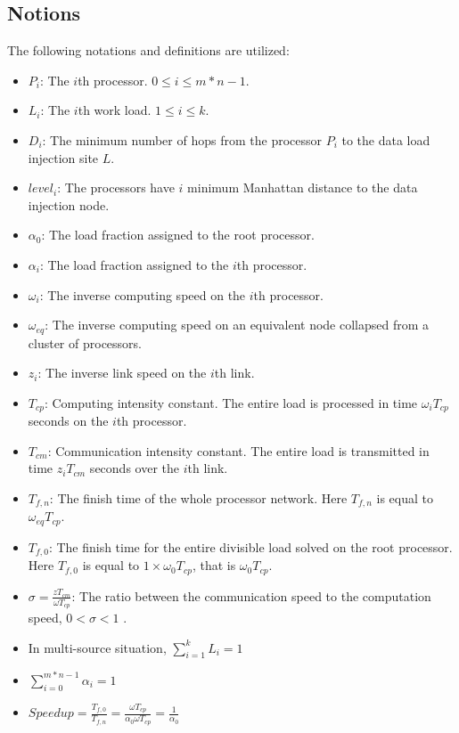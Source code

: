 \subsection{Notions}
The following notations and definitions are utilized:
\begin{itemize}
\item $P_{i}$: The $i$th processor.   $0  \leq i \leq m*n-1$.  
\item $L_{i}$: The $i$th work load.   $1 \leq i \leq k$.  
\item $D_{i}$: The minimum number of hops from the processor $P_{i}$ to the data load injection site $L$.  
\item $level_{i}$: The processors have $i$ minimum Manhattan distance to the data injection node.
\item $\alpha_{0}$: The load fraction assigned to the root processor.  
\item $\alpha_{i}$: The load fraction assigned to the $i$th processor.  
\item $\omega_{i}$: The inverse computing speed on the $i$th processor.  
\item $\omega_{eq}$: The inverse computing speed on an equivalent node collapsed from a cluster of processors.  
\item $z_{i}$: The inverse link speed on the $i$th link.  
\item $T_{cp}$: Computing intensity constant.  The entire load is processed in time $\omega_{i}T_{cp}$ seconds on the $i$th processor.  
\item $T_{cm}$: Communication intensity constant.  The entire load is transmitted in time $z_{i}T_{cm}$ seconds over the $i$th link.  
\item $T_{f, n}$: The finish time of the whole processor network.  Here $T_{f, n}$ is equal to $\omega_{eq}T_{cp}$.  
\item $T_{f, 0}$: The finish time for the entire divisible load solved on the root processor.  Here $T_{f, 0}$ is equal to $1 \times \omega_{0}T_{cp}$,  that is $\omega_{0}T_{cp}$.  
\item $\sigma = \frac{zT_{cm}}{\omega T_{cp}}$: The ratio between the communication speed to the computation speed,  $0 < \sigma < 1$   \cite{bharadwaj1996scheduling}   \cite{hung2004switching}.  

\item In multi-source situation, $\sum_{i = 1}^{k} L_{i} = 1$
\item $\sum_{i = 0}^{m*n-1} \alpha_{i}= 1$
\item $Speedup = \frac{T_{f, 0}}{T_{f, n}}= \frac{\omega T_{cp}}{\alpha_{0}\omega T_{cp}} = \frac{1}{\alpha_{0}}$
\end{itemize}